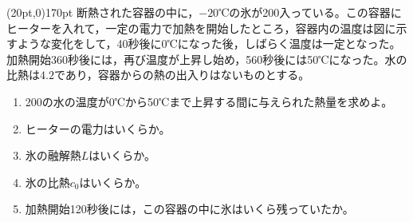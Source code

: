 \hakosyokika
\item
    \begin{mawarikomi}(20pt,0){170pt}{}
        断熱された容器の中に，$-20$℃の氷が200入っている。この容器にヒーターを入れて，一定の電力で加熱を開始したところ，容器内の温度は図に示すような変化をして，40秒後に0℃になった後，しばらく温度は一定となった。加熱開始360秒後には，再び温度が上昇し始め，560秒後には50℃になった。水の比熱は$4.2$であり，容器からの熱の出入りはないものとする。
        \begin{enumerate}
            \item 200の水の温度が0℃から50℃まで上昇する間に与えられた熱量を求めよ。
            \item ヒーターの電力はいくらか。
            \item 氷の融解熱$L$はいくらか。
            \item 氷の比熱$c_0$はいくらか。
            \item 加熱開始120秒後には，この容器の中に氷はいくら残っていたか。
        \end{enumerate}
    \end{mawarikomi}